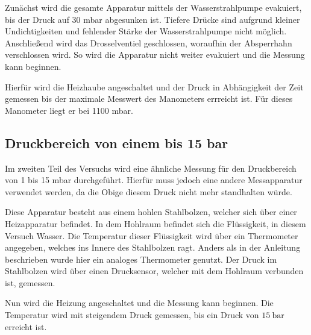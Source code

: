 Zunächst wird die gesamte Apparatur mittels der Wasserstrahlpumpe evakuiert, bis der Druck auf 30 mbar abgesunken ist.
Tiefere Drücke sind aufgrund kleiner Undichtigkeiten und fehlender Stärke der Wasserstrahlpumpe nicht möglich.
Anschließend wird das Drosselventiel geschlossen, woraufhin der Absperrhahn verschlossen wird.
So wird die Apparatur nicht weiter evakuiert und die Messung kann beginnen.

Hierfür wird die Heizhaube angeschaltet und der Druck in Abhängigkeit der Zeit gemessen bis der maximale Messwert des Manometers errreicht ist.
Für dieses Manometer liegt er bei 1100 mbar.

\subsection{Druckbereich von einem bis 15 bar}
Im zweiten Teil des Versuchs wird eine ähnliche Messung für den Druckbereich von 1 bis 15 mbar durchgeführt.
Hierfür muss jedoch eine andere Messapparatur verwendet werden, da die Obige diesem Druck nicht mehr standhalten würde.

Diese Apparatur besteht aus einem hohlen Stahlbolzen, welcher sich über einer Heizapparatur befindet.
In dem Hohlraum befindet sich die Flüssigkeit, in diesem Versuch Wasser.
Die Temperatur dieser Flüssigkeit wird über ein Thermometer angegeben, welches ins Innere des Stahlbolzen ragt.
Anders als in der Anleitung beschrieben wurde hier ein analoges Thermometer genutzt.
Der Druck im Stahlbolzen wird über einen Drucksensor, welcher mit dem Hohlraum verbunden ist, gemessen.

Nun wird die Heizung angeschaltet und die Messung kann beginnen.
Die Temperatur wird mit steigendem Druck gemessen, bis ein Druck von $\SI{15}{\bar}$ erreicht ist.
